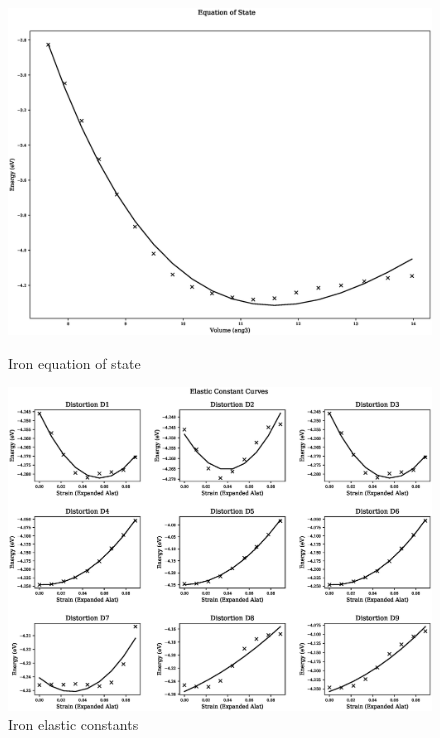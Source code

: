 \begin{figure}[ht] 
  \begin{minipage}[b]{0.4\linewidth}
    \centering
    \includegraphics[width=.9\linewidth]{chapters/results_potential_fitting/pot_fepd_fcc_1/fe_eos_0.eps} 
    \caption{Iron equation of state}  
  \end{minipage}%
  \begin{minipage}[b]{0.4\linewidth}
    \centering
    \includegraphics[width=.9\linewidth]{chapters/results_potential_fitting/pot_fepd_fcc_1/fe_ec_0.eps} 
    \caption{Iron elastic constants}  
  \end{minipage}%
\end{figure}


